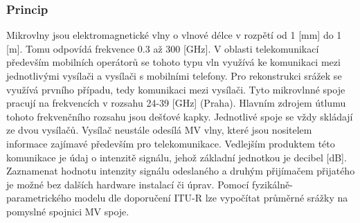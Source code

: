 \documentclass[a4paper,12pt]{article}
\begin{document}
\subsubsection{Princip}
Mikrovlny jsou elektromagnetické vlny o vlnové délce v rozpětí  od 1 [mm] do 1 [m]. Tomu odpovídá frekvence 0.3  až 300 [GHz]. V oblasti telekomunikací především mobilních operátorů se tohoto typu vln využívá ke komunikaci mezi jednotlivými vysílači a vysílači s mobilními telefony. Pro rekonstrukci srážek se využívá prvního případu, tedy komunikaci mezi vysílači. Tyto mikrovlnné spoje pracují na frekvencích v rozsahu 24-39 [GHz] (Praha). Hlavním zdrojem útlumu tohoto frekvenčního rozsahu jsou dešťové kapky. Jednotlivé spoje se vždy skládají ze dvou vysílačů. Vysílač neustále odesílá MV vlny, které jsou nositelem informace zajímavé především pro telekomunikace. Vedlejším produktem této komunikace je údaj o intenzitě signálu, jehož základní jednotkou je decibel [dB]. Zaznamenat hodnotu intenzity signálu odeslaného a druhým přijímačem přijatého je možné bez dalších hardware instalací či úprav. Pomocí fyzikálně-parametrického modelu dle doporučení ITU-R\cite{itu} lze vypočítat průměrné srážky na pomyslné spojnici MV spoje.
\end{document}
